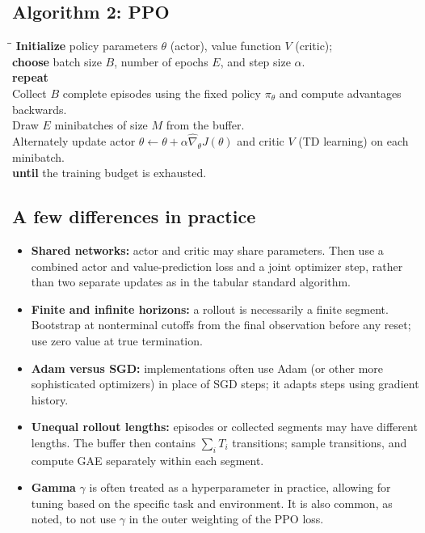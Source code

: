 \documentclass[11pt,a4paper]{article}
\begin{document}
\subsection{Algorithm 2: PPO}
{\small
\begin{tabbing}
\hspace{1.3em}\=\hspace{1.3em}\=\kill
\textbf{Initialize} policy parameters $\theta$ (actor), value function $V$ (critic);\\
\> \textbf{choose} batch size $B$, number of epochs $E$, and step size $\alpha$.\\
\textbf{repeat}\\
\> Collect $B$ complete episodes using the fixed policy $\pi_\theta$ and compute advantages backwards.\\
\> Draw $E$ minibatches of size $M$ from the buffer.\\
\> Alternately update actor $\theta\leftarrow\theta+\alpha\widehat\nabla_\theta J(\theta)$ and critic $V$ (TD learning) on each minibatch.\\
\textbf{until} the training budget is exhausted.
\end{tabbing}}

\subsection{A few differences in practice}
\begin{itemize}[itemsep=3pt]
 \item \textbf{Shared networks:} actor and critic may share parameters. Then
 use a combined actor and value-prediction loss and a joint optimizer step, rather than
 two separate updates as in the tabular standard algorithm.
 \item \textbf{Finite and infinite horizons:} a rollout is necessarily a finite segment. Bootstrap at nonterminal cutoffs from the final
 observation before any reset; use zero value at true termination.
 \item \textbf{Adam versus SGD:} implementations often use Adam (or other more sophisticated optimizers) in place of
 SGD steps; it adapts steps using gradient history.
 \item \textbf{Unequal rollout lengths:} episodes or collected segments may
 have different lengths. The buffer then contains $\sum_iT_i$ transitions;
 sample transitions, and compute GAE separately within each segment.
\item \textbf{Gamma} $\gamma$ is often treated as a hyperparameter in practice, allowing for tuning based on the specific task and environment. It is also common, as noted, to not use $\gamma$ in the outer weighting of the PPO loss.
\end{itemize}
\end{document}
